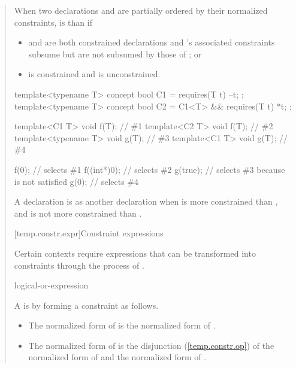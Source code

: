 \begin{quote}
\pnum
When two declarations  and  are
partially ordered by their normalized constraints,  is 
 than  if
% 
\begin{itemize}
\item {} and  are both constrained
declarations and 's associated constraints subsume but 
are not subsumed by those of ; or

\item {} is constrained and  is
unconstrained. 
\end{itemize}
% 
\enterexample
\begin{codeblock}
template<typename T> concept bool C1 = requires(T t) { --t; };
template<typename T> concept bool C2 = C1<T> && requires(T t) { *t; };

template<C1 T> void f(T);       // \#1
template<C2 T> void f(T);       // \#2
template<typename T> void g(T); // \#3
template<C1 T> void g(T);       // \#4

f(0);       // selects \#1
f((int*)0); // selects \#2
g(true);    // selects \#3 because  is not satisfied
g(0);       // selects \#4
\end{codeblock}
\exitexample

\pnum
A declaration  is 
as another declaration  when  is more
constrained than , and  is not more
constrained than .


[temp.constr.expr]{Constraint expressions}

\pnum
Certain contexts require expressions that can be transformed
into constraints through the process of .

\begin{bnf}
\br
    logical-or-expression
\end{bnf}

\pnum
A  is  by forming a 
constraint as follows.

\begin{itemize}
\item The normalized form of  is the normalized form of 
.

\item The normalized form of  is
the disjunction (\ref{temp.constr.op}) of the 
normalized form of  and the normalized form of 
.


\end{itemize}
\end{quote}
